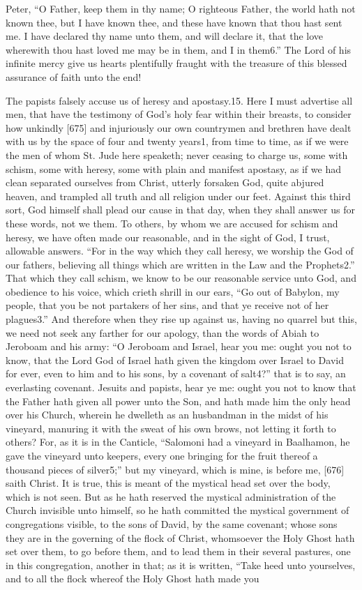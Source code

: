 Peter, “O Father, keep them in thy name; O righteous Father, the world hath not known thee, but I have known thee, and these have known that thou hast sent me. I have declared thy name unto them, and will declare it, that the love wherewith thou hast loved me may be in them, and I in them6.” The Lord of his infinite mercy give us hearts plentifully fraught with the treasure of this blessed assurance of faith unto the end!

The papists falsely accuse us of heresy and apostasy.15. Here I must advertise all men, that have the testimony of God’s holy fear within their breasts, to consider how unkindly [675] and injuriously our own countrymen and brethren have dealt with us by the space of four and twenty years1, from time to time, as if we were the men of whom St. Jude here speaketh; never ceasing to charge us, some with schism, some with heresy, some with plain and manifest apostasy, as if we had clean separated ourselves from Christ, utterly forsaken God, quite abjured heaven, and trampled all truth and all religion under our feet. Against this third sort, God himself shall plead our cause in that day, when they shall answer us for these words, not we them. To others, by whom we are accused for schism and heresy, we have often made our reasonable, and in the sight of God, I trust, allowable answers. “For in the way which they call heresy, we worship the God of our fathers, believing all things which are written in the Law and the Prophets2.” That which they call schism, we know to be our reasonable service unto God, and obedience to his voice, which crieth shrill in our ears, “Go out of Babylon, my people, that you be not partakers of her sins, and that ye receive not of her plagues3.” And therefore when they rise up against us, having no quarrel but this, we need not seek any farther for our apology, than the words of Abiah to Jeroboam and his army: “O Jeroboam and Israel, hear you me: ought you not to know, that the Lord God of Israel hath given the kingdom over Israel to David for ever, even to him and to his sons, by a covenant of salt4?” that is to say, an everlasting covenant. Jesuits and papists, hear ye me: ought you not to know that the Father hath given all power unto the Son, and hath made him the only head over his Church, wherein he dwelleth as an husbandman in the midst of his vineyard, manuring it with the sweat of his own brows, not letting it forth to others? For, as it is in the Canticle, “Salomoni had a vineyard in Baalhamon, he gave the vineyard unto keepers, every one bringing for the fruit thereof a thousand pieces of silver5;” but my vineyard, which is mine, is before me, [676] saith Christ. It is true, this is meant of the mystical head set over the body, which is not seen. But as he hath reserved the mystical administration of the Church invisible unto himself, so he hath committed the mystical government of congregations visible, to the sons of David, by the same covenant; whose sons they are in the governing of the flock of Christ, whomsoever the Holy Ghost hath set over them, to go before them, and to lead them in their several pastures, one in this congregation, another in that; as it is written, “Take heed unto yourselves, and to all the flock whereof the Holy Ghost hath made you 